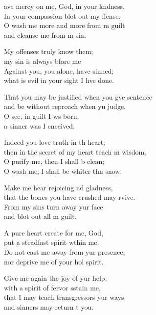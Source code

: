 \begin{psalmverse}
  \begin{patverse}
    ave mercy on me, God, in your k\pointup{\i}ndness.\Med\\
In your compassion blot out my ffense.\\
O wash me more and more from m guilt\Med\\
and cleanse me from m sin.

My offenses truly  know them;\Med\\
my sin is always bfore me\\
Against you, you alone, have  sinned;\Med\\
what is evil in your sight I hve done.

That you may be justified when you g\pointup{\i}ve sentence\Med\\
and be without reproach when yu judge.\\
O see, in guilt I ws born,\Med\\
a sinner was I cnceived.

Indeed you love truth in th heart;\Med\\
then in the secret of my heart teach m wisdom.\\
O purify me, then I shall b clean;\Med\\
O wash me, I shall be whiter thn snow.

Make me hear rejoicing nd gladness,\Med\\
that the bones you have crushed may rvive.\\
From my sins turn away yur face\Med\\
and blot out all m guilt.

A pure heart create for me,  God,\Med\\
put a steadfast spirit w\pointup{\i}thin me.\\
Do not cast me away from yur presence,\Med\\
nor deprive me of your hol spirit.

Give me again the joy of yur help;\Med\\
with a spirit of fervor sstain me,\\
that I may teach transgressors yur ways\Med\\
and sinners may return t you.


\end{patverse}
\end{psalmverse}
